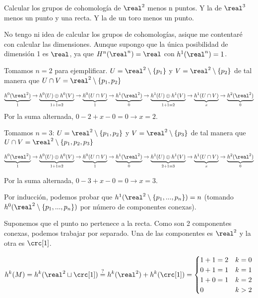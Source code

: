 \begin{problem}[9]

\ppart Calcular los grupos de cohomología de $\real^2$ menos n puntos.
\ppart Y la de $\real^3$ menos un punto y una recta.
\ppart Y la de un toro menos un punto.

\solution
{}

No tengo ni idea de calcular los grupos de cohomologías, asique me contentaré con calcular las dimensiones. 
%
Aunque supongo que la única posibilidad de dimensión 1 es $\real$, ya que $H^n(\real^n) = \real$ con $h^1(\real^n) = 1$.

\spart 
Tomamos $n=2$ para ejemplificar.
%
$U = \real^2\setminus\{p_1\}$ y $V=\real^2\setminus\{p_2\}$ de tal manera que $U\cap V = \real^2\setminus \{p_1,p_2\}$

\[
	\underbrace{h^0(\real^2)}_{1} \to 
	\underbrace{h^0(U)\oplus h^0(V)}_{1+1=2} \to 
	\underbrace{h^0(U\cap V)}_{1} \to 
	\underbrace{h^1(\real^2)}_{0} \to 
	\underbrace{h^1(U)\oplus h^1(V)}_{1+1=2} \to 
	\underbrace{h^1(U\cap V)}_{x} \to 
	\underbrace{h^2 (\real^2)}_{0}
\]
Por la suma alternada, $0-2+x-0=0 \to x=2$.


Tomamos $n=3$:
%
$U = \real^2\setminus\{p_1,p_2\}$ y $V=\real^2\setminus\{p_3\}$ de tal manera que $U\cap V = \real^2\setminus \{p_1,p_2,p_3\}$

\[
	\underbrace{h^0(\real^2)}_{1} \to 
	\underbrace{h^0(U)\oplus h^0(V)}_{1+1=2} \to 
	\underbrace{h^0(U\cap V)}_{1} \to 
	\underbrace{h^1(\real^2)}_{0} \to 
	\underbrace{h^1(U)\oplus h^1(V)}_{2+1=3} \to 
	\underbrace{h^1(U\cap V)}_{x} \to 
	\underbrace{h^2 (\real^2)}_{0}
\]

Por la suma alternada, $0-3+x-0=0 \to x=3$.

Por inducción, podemos probar que $h^1(\real^2 \setminus\{p_1,...,p_n\}) = n$ (tomando $h^0(\real^2 \setminus\{p_1,...,p_n\})$ por número de componentes conexas).

\spart Suponemos que el punto no pertenece a la recta.
%
Como son 2 componentes conexas, podemos trabajar por separado.
%
Una de las componentes es $\real^2$ y la otra es $\crc[1]$.

\[h^k(M) = h^k(\real^2\sqcup\crc[1]) \overset{?}{=}h^k(\real^2) + h^k(\crc[1]) = 
	\begin{cases}
		1+1 = 2 & k=0\\
		0+1 = 1 & k=1\\
		1+0 = 1 & k=2\\
		0 & k>2
	\end{cases}
\]


\spart


\end{problem}

